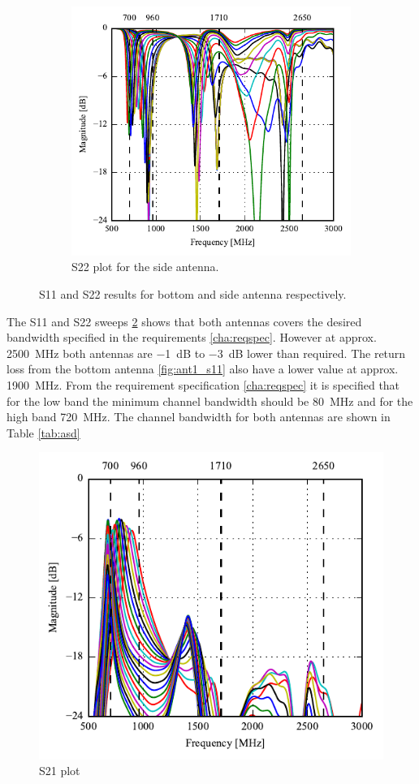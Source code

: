 \begin{figure}[htbp]
\begin{subfigure}[b]{0.49\linewidth}
        \includegraphics{img/tech_sol/monopole/s22_sweep}
        \caption{S22 plot for the side antenna.}
        \label{fig:ant1_s22}
    \end{subfigure}
    \caption{S11 and S22 results for bottom and side antenna respectively.}
    \label{fig:ant1_sparam}
\end{figure}
The S11 and S22 sweeps \ref{fig:ant1_sparam} shows that both antennas covers the desired bandwidth specified in the requirements \ref{cha:reqspec}. However at approx. \SI{2500}{MHz} both antennas are \SI{-1}{dB} to \SI{-3}{dB} lower than required. The return loss from the bottom antenna \ref{fig:ant1_s11} also have a lower value at approx. \SI{1900}{MHz}. From the requirement specification \ref{cha:reqspec} it is specified that for the low band the minimum channel bandwidth should be \SI{80}{MHz} and for the high band \SI{720}{MHz}. The channel bandwidth for both antennas are shown in Table \ref{tab:asd}     


\begin{figure}[htbp]%
  \centering
  \includegraphics{img/tech_sol/monopole/s21_sweep}
  \caption{S21 plot}
  \label{fig:ant1_s21}
\end{figure}



